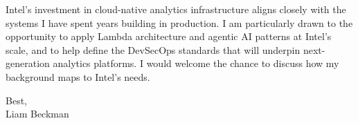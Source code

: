 \vspace*{\baselineskip}

Intel's investment in cloud-native analytics infrastructure aligns closely with the systems I have spent years building in production. I am particularly drawn to the opportunity to apply Lambda architecture and agentic AI patterns at Intel's scale, and to help define the DevSecOps standards that will underpin next-generation analytics platforms. I would welcome the chance to discuss how my background maps to Intel's needs.

\vspace*{\baselineskip}

Best,\\

Liam Beckman

\vfill \myBreak{}



